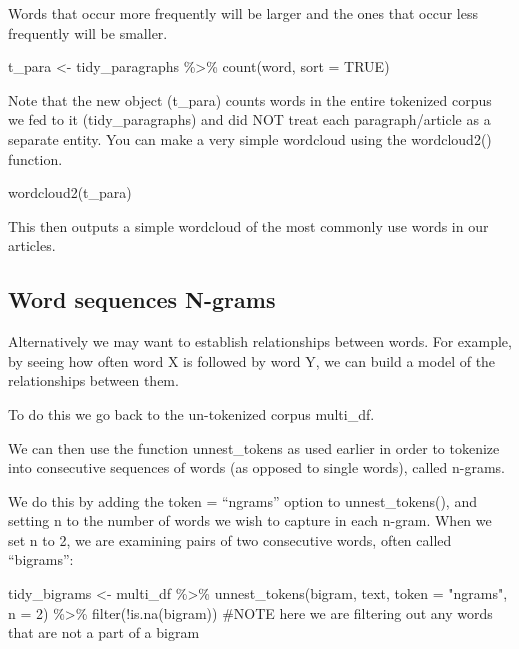 \documentclass[
  letterpaper,
  DIV=11,
  numbers=noendperiod]{scrartcl}
\newenvironment{Shaded}{\begin{snugshade}}{\end{snugshade}}
\newcommand{\AttributeTok}[1]{\textcolor[rgb]{0.40,0.45,0.13}{#1}}
\newcommand{\CommentTok}[1]{\textcolor[rgb]{0.37,0.37,0.37}{#1}}
\newcommand{\ConstantTok}[1]{\textcolor[rgb]{0.56,0.35,0.01}{#1}}
\newcommand{\DecValTok}[1]{\textcolor[rgb]{0.68,0.00,0.00}{#1}}
\newcommand{\FunctionTok}[1]{\textcolor[rgb]{0.28,0.35,0.67}{#1}}
\newcommand{\NormalTok}[1]{\textcolor[rgb]{0.00,0.23,0.31}{#1}}
\newcommand{\OtherTok}[1]{\textcolor[rgb]{0.00,0.23,0.31}{#1}}
\newcommand{\SpecialCharTok}[1]{\textcolor[rgb]{0.37,0.37,0.37}{#1}}
\newcommand{\StringTok}[1]{\textcolor[rgb]{0.13,0.47,0.30}{#1}}
\begin{document}
Words that occur more frequently will be larger and the ones that occur
less frequently will be smaller.

\begin{Shaded}
\begin{Highlighting}[]
\NormalTok{t\_para }\OtherTok{\textless{}{-}}\NormalTok{ tidy\_paragraphs }\SpecialCharTok{\%\textgreater{}\%}
  \FunctionTok{count}\NormalTok{(word, }\AttributeTok{sort =} \ConstantTok{TRUE}\NormalTok{) }
\end{Highlighting}
\end{Shaded}

Note that the new object (t\_para) counts words in the entire tokenized
corpus we fed to it (tidy\_paragraphs) and did NOT treat each
paragraph/article as a separate entity. You can make a very simple
wordcloud using the wordcloud2() function.

\begin{Shaded}
\begin{Highlighting}[]
\FunctionTok{wordcloud2}\NormalTok{(t\_para)}
\end{Highlighting}
\end{Shaded}

This then outputs a simple wordcloud of the most commonly use words in
our articles.

\hypertarget{word-sequences-n-grams}{%
\subsection{Word sequences N-grams}\label{word-sequences-n-grams}}

Alternatively we may want to establish relationships between words. For
example, by seeing how often word X is followed by word Y, we can build
a model of the relationships between them.

To do this we go back to the un-tokenized corpus multi\_df.

We can then use the function unnest\_tokens as used earlier in order to
tokenize into consecutive sequences of words (as opposed to single
words), called n-grams.

We do this by adding the token = ``ngrams'' option to unnest\_tokens(),
and setting n to the number of words we wish to capture in each n-gram.
When we set n to 2, we are examining pairs of two consecutive words,
often called ``bigrams'':

\begin{Shaded}
\begin{Highlighting}[]
\NormalTok{tidy\_bigrams }\OtherTok{\textless{}{-}}\NormalTok{ multi\_df }\SpecialCharTok{\%\textgreater{}\%}
  \FunctionTok{unnest\_tokens}\NormalTok{(bigram, text, }\AttributeTok{token =} \StringTok{"ngrams"}\NormalTok{, }\AttributeTok{n =} \DecValTok{2}\NormalTok{) }\SpecialCharTok{\%\textgreater{}\%}
  \FunctionTok{filter}\NormalTok{(}\SpecialCharTok{!}\FunctionTok{is.na}\NormalTok{(bigram)) }\CommentTok{\#NOTE here we are filtering out any words that are not a part of a bigram}
\end{Highlighting}
\end{Shaded}
\end{document}
